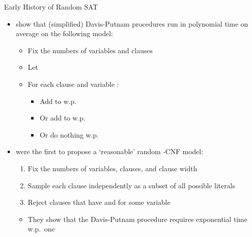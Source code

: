 \documentclass{beamer}
\begin{document}
\begin{frame}{Early History of Random SAT}
  \begin{itemize}
    \item \textcite{DBLP:journals/ipl/GoldbergPB82} show that (simplified)
          \alert{Davis-Putnam procedures} run in \alert{polynomial time} on
          average on the following model:
          \begin{itemize}
            \item Fix the numbers of \alert{variables} and \alert{clauses}
            \item Let 
            \item For each clause  and variable :
            \begin{itemize}
              \item \alert{Add}  to  w.p.\
              \item Or \alert{add}  to  w.p.\
              \item Or \alert{do nothing} w.p.\ \structure{$1 - 2p$}
            \end{itemize}
          \end{itemize}
          \pause
    \item \textcite{DBLP:journals/dam/FrancoP83} were the first to propose a
    `reasonable' random -CNF model:
    \begin{enumerate}
      \item Fix the numbers of \alert{variables}, \alert{clauses}, and
            \alert{clause width}
      \item \alert{Sample each clause} independently as a subset of all possible
            literals
      \item \alert{Reject} clauses that have \structure{$x$} and
             for some variable 
    \end{enumerate}
    \begin{itemize}
      \item They show that the Davis-Putnam procedure \alert{requires
            exponential time} w.p.\ one
    \end{itemize}
  \end{itemize}
\end{frame}
\end{document}
